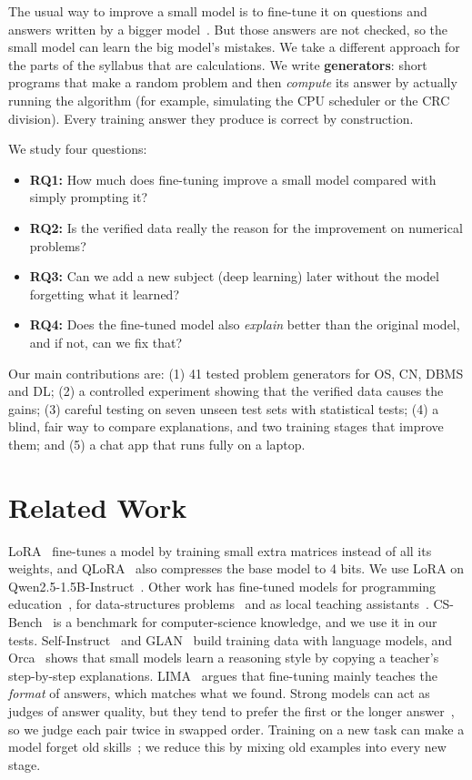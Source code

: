 \documentclass[conference]{IEEEtran}
\begin{document}
The usual way to improve a small model is to fine-tune it on questions and answers written by a bigger model~\cite{selfinstruct,glan}. But those answers are not checked, so the small model can learn the big model's mistakes. We take a different approach for the parts of the syllabus that are calculations. We write \textbf{generators}: short programs that make a random problem and then \emph{compute} its answer by actually running the algorithm (for example, simulating the CPU scheduler or the CRC division). Every training answer they produce is correct by construction.

We study four questions:
\begin{itemize}
\item \textbf{RQ1:} How much does fine-tuning improve a small model compared with simply prompting it?
\item \textbf{RQ2:} Is the verified data really the reason for the improvement on numerical problems?
\item \textbf{RQ3:} Can we add a new subject (deep learning) later without the model forgetting what it learned?
\item \textbf{RQ4:} Does the fine-tuned model also \emph{explain} better than the original model, and if not, can we fix that?
\end{itemize}
Our main contributions are: (1) 41 tested problem generators for OS, CN, DBMS and DL; (2) a controlled experiment showing that the verified data causes the gains; (3) careful testing on seven unseen test sets with statistical tests; (4) a blind, fair way to compare explanations, and two training stages that improve them; and (5) a chat app that runs fully on a laptop.

\section{Related Work}
LoRA~\cite{lora} fine-tunes a model by training small extra matrices instead of all its weights, and QLoRA~\cite{qlora} also compresses the base model to 4 bits. We use LoRA on Qwen2.5-1.5B-Instruct~\cite{qwen25}. Other work has fine-tuned models for programming education~\cite{guidelm}, for data-structures problems~\cite{dsaqlora} and as local teaching assistants~\cite{aita,smallmodels}. CS-Bench~\cite{csbench} is a benchmark for computer-science knowledge, and we use it in our tests. Self-Instruct~\cite{selfinstruct} and GLAN~\cite{glan} build training data with language models, and Orca~\cite{orca} shows that small models learn a reasoning style by copying a teacher's step-by-step explanations. LIMA~\cite{lima} argues that fine-tuning mainly teaches the \emph{format} of answers, which matches what we found. Strong models can act as judges of answer quality, but they tend to prefer the first or the longer answer~\cite{mtbench}, so we judge each pair twice in swapped order. Training on a new task can make a model forget old skills~\cite{forgetting}; we reduce this by mixing old examples into every new stage.
\end{document}
